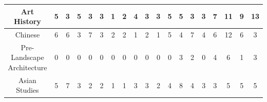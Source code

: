 \documentclass[10pt]{article}
\begin{document}
\begin{landscape}
\begin{longtable}[c]{|ccccccccccccccccccc|}
	\multicolumn{1}{|c|}{Art History}                                & \multicolumn{1}{c|}{5}          & \multicolumn{1}{c|}{3}          & \multicolumn{1}{c|}{5}          & \multicolumn{1}{c|}{3}          & \multicolumn{1}{c|}{3}          & \multicolumn{1}{c|}{1}          & \multicolumn{1}{c|}{2}          & \multicolumn{1}{c|}{4}          & \multicolumn{1}{c|}{3}          & \multicolumn{1}{c|}{3}          & \multicolumn{1}{c|}{5}          & \multicolumn{1}{c|}{5}          & \multicolumn{1}{c|}{3}          & \multicolumn{1}{c|}{3}          & \multicolumn{1}{c|}{7}          & \multicolumn{1}{c|}{11}         & \multicolumn{1}{c|}{9}          & 13         \\ \hline
	\multicolumn{1}{|c|}{Chinese}                                    & \multicolumn{1}{c|}{6}          & \multicolumn{1}{c|}{6}          & \multicolumn{1}{c|}{3}          & \multicolumn{1}{c|}{7}          & \multicolumn{1}{c|}{3}          & \multicolumn{1}{c|}{2}          & \multicolumn{1}{c|}{2}          & \multicolumn{1}{c|}{1}          & \multicolumn{1}{c|}{2}          & \multicolumn{1}{c|}{1}          & \multicolumn{1}{c|}{5}          & \multicolumn{1}{c|}{4}          & \multicolumn{1}{c|}{7}          & \multicolumn{1}{c|}{4}          & \multicolumn{1}{c|}{6}          & \multicolumn{1}{c|}{12}         & \multicolumn{1}{c|}{6}          & 3          \\ \hline
	\multicolumn{1}{|c|}{Pre-Landscape Architecture}                 & \multicolumn{1}{c|}{0}          & \multicolumn{1}{c|}{0}          & \multicolumn{1}{c|}{0}          & \multicolumn{1}{c|}{0}          & \multicolumn{1}{c|}{0}          & \multicolumn{1}{c|}{0}          & \multicolumn{1}{c|}{0}          & \multicolumn{1}{c|}{0}          & \multicolumn{1}{c|}{0}          & \multicolumn{1}{c|}{0}          & \multicolumn{1}{c|}{0}          & \multicolumn{1}{c|}{3}          & \multicolumn{1}{c|}{2}          & \multicolumn{1}{c|}{0}          & \multicolumn{1}{c|}{4}          & \multicolumn{1}{c|}{6}          & \multicolumn{1}{c|}{1}          & 3          \\ \hline
	\multicolumn{1}{|c|}{Asian Studies}                              & \multicolumn{1}{c|}{5}          & \multicolumn{1}{c|}{7}          & \multicolumn{1}{c|}{3}          & \multicolumn{1}{c|}{2}          & \multicolumn{1}{c|}{2}          & \multicolumn{1}{c|}{1}          & \multicolumn{1}{c|}{1}          & \multicolumn{1}{c|}{3}          & \multicolumn{1}{c|}{3}          & \multicolumn{1}{c|}{2}          & \multicolumn{1}{c|}{4}          & \multicolumn{1}{c|}{8}          & \multicolumn{1}{c|}{4}          & \multicolumn{1}{c|}{3}          & \multicolumn{1}{c|}{3}          & \multicolumn{1}{c|}{5}          & \multicolumn{1}{c|}{5}          & 5          \\ \hline

\end{longtable}
\end{landscape}
\end{document}

